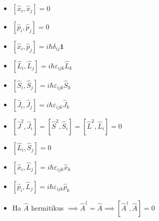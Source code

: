 \documentclass[12pt]{article}
\theoremstyle{plain}
\newcommand{\commut}[2]{\left [ #1 , #2 \right]}
\begin{document}
\begin{itemize}
    \item $\commut{\hat x_i}{\hat x_j} = 0$
    \item $\commut{\hat p_i}{\hat p_j} = 0$
    \item $\commut{\hat x_i}{\hat p_j} = i\hbar \delta_{ij}\mathbf 1$
    \item $\commut{\hat L_i}{\hat L_j} = i \hbar \varepsilon_{ijk}\hat L_k$
    \item $\commut{\hat S_i}{\hat S_j} = i \hbar \varepsilon_{ijk}\hat S_k$
    \item $\commut{\hat J_i}{\hat J_j} = i \hbar \varepsilon_{ijk}\hat J_k$
    \item $\commut{\hat J^2}{\hat J_i} = \commut{\hat S^2}{\hat S_i} = \commut{\hat L^2}{\hat L_i} = 0$
    \item $\commut{\hat L_i}{\hat S_j} = 0$
    \item $\commut{\hat x_i}{\hat L_j} = i \hbar \varepsilon_{ijk}\hat x_k$
    \item $\commut{\hat p_i}{\hat L_j} = i \hbar \varepsilon_{ijk}\hat p_k$    
    \item Ha $\hat A$ hermitikus $\implies \hat A^\dag = \hat A \implies \commut{\hat A^\dag}{\hat A} = 0$  
    
    
\end{itemize}
\end{document}
